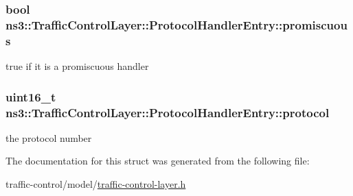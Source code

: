 \subsubsection[{\texorpdfstring{promiscuous}{promiscuous}}]{\setlength{\rightskip}{0pt plus 5cm}bool ns3\+::\+Traffic\+Control\+Layer\+::\+Protocol\+Handler\+Entry\+::promiscuous}\hypertarget{structns3_1_1TrafficControlLayer_1_1ProtocolHandlerEntry_a35b19b21a9cdf4075020b6c3ff255f8c}{}\label{structns3_1_1TrafficControlLayer_1_1ProtocolHandlerEntry_a35b19b21a9cdf4075020b6c3ff255f8c}


true if it is a promiscuous handler 

\subsubsection[{\texorpdfstring{protocol}{protocol}}]{\setlength{\rightskip}{0pt plus 5cm}uint16\+\_\+t ns3\+::\+Traffic\+Control\+Layer\+::\+Protocol\+Handler\+Entry\+::protocol}\hypertarget{structns3_1_1TrafficControlLayer_1_1ProtocolHandlerEntry_a83b258c5fa435c0cdcbf251e79b10ac4}{}\label{structns3_1_1TrafficControlLayer_1_1ProtocolHandlerEntry_a83b258c5fa435c0cdcbf251e79b10ac4}


the protocol number 



The documentation for this struct was generated from the following file\+:\begin{DoxyCompactItemize}
\item 
traffic-\/control/model/\hyperlink{traffic-control-layer_8h}{traffic-\/control-\/layer.\+h}\end{DoxyCompactItemize}
